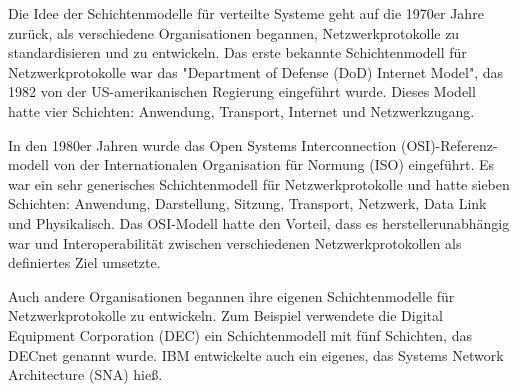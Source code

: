 Die Idee der Schichtenmodelle für verteilte Systeme geht auf die 1970er Jahre zurück, als verschiedene Organisationen begannen, Netzwerkprotokolle zu standardisieren und zu entwickeln. Das erste bekannte Schichtenmodell für Netzwerkprotokolle war das "Department of Defense (DoD) Internet Model", das 1982 von der US-amerikanischen Regierung eingeführt wurde. Dieses Modell hatte vier Schichten: Anwendung, Transport, Internet und Netzwerkzugang.

In den 1980er Jahren wurde das Open Systems Interconnection (OSI)-Referenz-modell von der Internationalen Organisation für Normung (ISO) eingeführt. Es war ein sehr generisches Schichtenmodell für Netzwerkprotokolle und hatte sieben Schichten: Anwendung, Darstellung, Sitzung, Transport, Netzwerk, Data Link und Physikalisch. Das OSI-Modell hatte den Vorteil, dass es herstellerunabhängig war und Interoperabilität zwischen verschiedenen Netzwerkprotokollen als definiertes Ziel umsetzte.

Auch andere Organisationen begannen ihre eigenen Schichtenmodelle für Netzwerkprotokolle zu entwickeln. Zum Beispiel verwendete die Digital Equipment Corporation (DEC) ein Schichtenmodell mit fünf Schichten, das DECnet genannt wurde. IBM entwickelte auch ein eigenes, das Systems Network Architecture (SNA) hieß.

